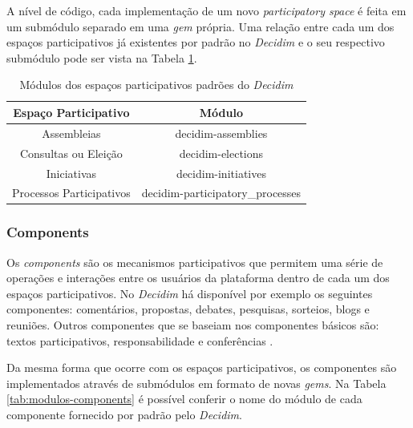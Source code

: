 A nível de código, cada implementação de um novo \textit{participatory space} é feita em um submódulo separado em uma \textit{gem} própria. Uma relação entre cada um dos espaços participativos já existentes por padrão no \textit{Decidim} e o seu respectivo submódulo pode ser vista na Tabela \ref{tab:modulos-participatoryspaces}.

\begin{table}
  \centering
  \caption{Módulos dos espaços participativos padrões do \textit{Decidim}}
  \label{tab:modulos-participatoryspaces}
  \begin{tabular}{cc}
    \toprule
    Espaço Participativo & Módulo \\
    \midrule
    Assembleias & decidim-assemblies \\
    Consultas ou Eleição & decidim-elections \\
    Iniciativas & decidim-initiatives \\
    Processos Participativos & decidim-participatory\_processes \\
    \bottomrule
  \end{tabular}
\end{table}

\subsubsection{Components}

Os \textit{components} são os mecanismos participativos que permitem uma série de operações e interações entre os usuários da plataforma dentro de cada um dos espaços participativos. No \textit{Decidim} há disponível por exemplo os seguintes componentes: comentários, propostas, debates, pesquisas, sorteios, blogs e reuniões. Outros componentes que se baseiam nos componentes básicos são: textos participativos, responsabilidade e conferências \cite{decidim-descriptionpage}.

Da mesma forma que ocorre com os espaços participativos, os componentes são implementados através de submódulos em formato de novas \textit{gems}. Na Tabela \ref{tab:modulos-components} é possível conferir o nome do módulo de cada componente fornecido por padrão pelo \textit{Decidim}.


